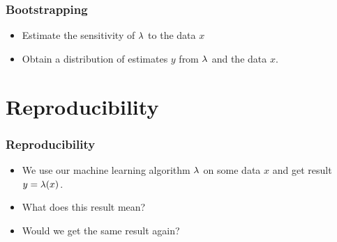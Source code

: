 \begin{frame}
  \frametitle{Bootstrapping}
  \begin{itemize}
  \item Estimate the sensitivity of $\lambda$ to the data $x$
  \item Obtain a distribution of estimates $y$ from $\lambda$ and the data $x$.
  \end{itemize}
\end{frame}

\section{Reproducibility}

\begin{frame}
  \frametitle{Reproducibility}
  \begin{itemize}
  \item We use our machine learning algorithm $\lambda$ on some data $x$ and get result $y = \lambda(x)$.
  \item What does this result mean?
  \item Would we get the same result again?
  \end{itemize}
\end{frame}

